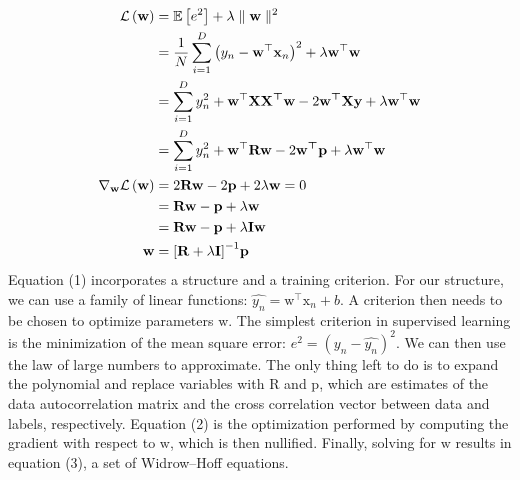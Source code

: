 \documentclass[11pt]{article}
\begin{document}
\begin{tcolorbox}[colback=CrispBlue!5!white,colframe=CrispBlue!75!black,title=1. Make the derivation of the closed solution for \textbf{w}.]
    \begin{align}
        \notag\mathcal{L}\left(\bm{\mathrm {w}}\right)&=\mathbb{E}\left[e^2 \right]+\lambda \parallel \bm{\mathrm {w}}\parallel ^2\\
        &=\frac{1}{N}\sum_{i=1}^{D}{\left(y_n-\bm{\mathrm{w}}^\top\bm{\mathrm{x}}_n\right)}^2+\lambda \bm{\mathrm{w}}^\top\bm{\mathrm{w}}\\
        \notag&=\sum_{i=1}^{D}y_n^2+\bm{\mathrm{w}}^\top\bm{\mathrm{XX^\top w}}-2\bm{\mathrm{w^\top Xy}}+\lambda \bm{\mathrm{w}}^\top\bm{\mathrm{w}}\\
        \notag&=\sum_{i=1}^{D}y_n^2+\bm{\mathrm{w}}^\top\bm{\mathrm{Rw}}-2\bm{\mathrm{w^\top p}}+\lambda \bm{\mathrm{w}}^\top\bm{\mathrm{w}}\\
        \nabla_{\bm{\mathrm{w}}}\mathcal{L}\left(\bm{\mathrm {w}}\right)&=2\bm{\mathrm{Rw}}-2\bm{\mathrm{p}}+2\lambda\bm{\mathrm{w}}=0\\
        \notag&=\bm{\mathrm{Rw}}-\bm{\mathrm{p}}+\lambda\bm{\mathrm{w}}\\
        \notag&=\bm{\mathrm{Rw}}-\bm{\mathrm{p}}+\lambda\bm{\mathrm{Iw}}\\
        \bm{\mathrm{w}}&={\left[\bm{\mathrm{R}}+\lambda\bm{\mathrm{I}}\right]}^{-1}\bm{\mathrm{p}}
    \end{align}
Equation (1) incorporates a structure and a training criterion. For our structure, we can use a family of linear functions: \( \hat{y_n} = \bm{\mathrm{w}}^\top\bm{\mathrm{x}}_n + b\). A criterion then needs to be chosen to optimize parameters \( \bm{\mathrm {w}} \). The simplest criterion in supervised learning is the minimization of the mean square error: \( e^2 = \left(y_n - \hat{y_n} \right) ^2 \). We can then use the law of large numbers to approximate. The only thing left to do is to expand the polynomial and replace variables with \( \bm{\mathrm {R}} \) and \( \bm{\mathrm {p}} \), which are estimates of the data autocorrelation matrix and the cross correlation vector between data and labels, respectively. Equation (2) is the optimization performed by computing the gradient with respect to \( \bm{\mathrm {w}} \), which is then nullified. Finally, solving for \( \bm{\mathrm {w}} \) results in equation (3), a set of Widrow--Hoff equations.
\end{tcolorbox}
\end{document}
